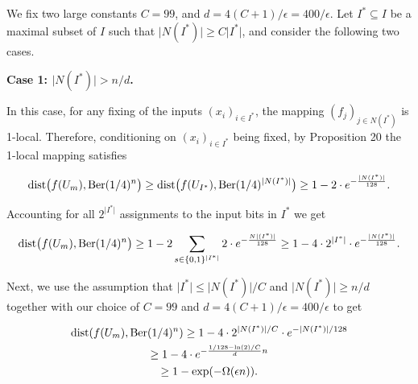 \documentclass[10pt,a4paper]{article}
\begin{document}
We fix two large constants $C=99$, and $d=4(C+1)/\epsilon=400/\epsilon$.
Let $I^{*}\subseteq I$ be a maximal subset of $I$ such that $\lvert N(I^{*})\rvert\geq C\lvert I^{*}\rvert$, and consider the following two cases.\par





\par\medskip\noindent\textbf{Case 1: $\lvert N(I^{*})\rvert>n/d$.}\par




In this case, for any fixing of the inputs $(x_{i})_{i\in I^{*}}$,
the mapping $(f_{j})_{j\in N(I^{*})}$ is 1-local. Therefore, conditioning on $(x_{i})_{i\in I^{*}}$ being fixed, by Proposition 20 the 1-local mapping satisfies\par


\[\begin{gathered}
\displaystyle\mathrm{dist}\bigl(f(U_{m}),\textnormal{Ber}(1/4)^{n}\bigr)\geq\mathrm{dist}\bigl(f(U_{I^{*}}),\textnormal{Ber}(1/4)^{\lvert N(I^{*})\rvert}\bigr)\geq 1-2\cdot e^{-\frac{\lvert N(I^{*})\rvert}{128}}.
\end{gathered}\]


Accounting for all $2^{\lvert I^{*}\rvert}$ assignments to the input bits in $I^{*}$ we get\par


\[\begin{gathered}
\displaystyle\mathrm{dist}\bigl(f(U_{m}),\textnormal{Ber}(1/4)^{n}\bigr)\geq 1-2\sum_{s\in\{0,1\}^{\lvert I^{*}\rvert}}2\cdot e^{-\frac{N\lvert(I^{*})\rvert}{128}}\geq 1-4\cdot 2^{\lvert I^{*}\rvert}\cdot e^{-\frac{\lvert N(I^{*})\rvert}{128}}.
\end{gathered}\]


Next, we use the assumption that $\lvert I^{*}\rvert\leq\lvert N(I^{*})\rvert/C$ and $\lvert N(I^{*})\rvert\geq n/d$ together with our choice of $C=99$ and $d=4(C+1)/\epsilon=400/\epsilon$ to get\par


\[\begin{gathered}
\displaystyle\mathrm{dist}(f(U_{m}),\textnormal{Ber}(1/4)^{n}) \displaystyle\geq \displaystyle 1-4\cdot 2^{\lvert N(I^{*})\rvert/C}\cdot e^{-\lvert N(I^{*})\rvert/128} \\
\displaystyle\geq \displaystyle 1-4\cdot e^{-\frac{1/128-\ln(2)/C}{d}n} \\
\displaystyle\geq \displaystyle 1-\exp(-\Omega(\epsilon n)).
\end{gathered}\]
\end{document}
